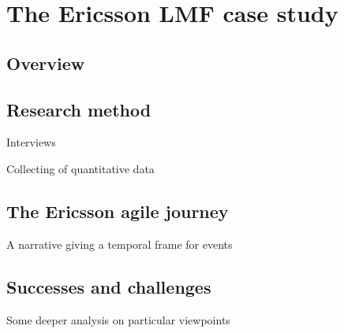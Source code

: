 
\chapter{The Ericsson LMF case study}
\label{chapter:ericsson}


\section{Overview}


\section{Research method}

Interviews

Collecting of quantitative data


\section{The Ericsson agile journey}

A narrative giving a temporal frame for events


\section{Successes and challenges}

Some deeper analysis on particular viewpoints
